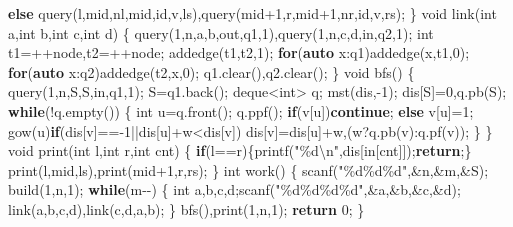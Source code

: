 \documentclass[
]{article}
\newenvironment{Shaded}{}{}
\newcommand{\ControlFlowTok}[1]{\textcolor[rgb]{0.00,0.44,0.13}{\textbf{#1}}}
\newcommand{\DataTypeTok}[1]{\textcolor[rgb]{0.56,0.13,0.00}{#1}}
\newcommand{\DecValTok}[1]{\textcolor[rgb]{0.25,0.63,0.44}{#1}}
\newcommand{\KeywordTok}[1]{\textcolor[rgb]{0.00,0.44,0.13}{\textbf{#1}}}
\newcommand{\NormalTok}[1]{#1}
\newcommand{\SpecialCharTok}[1]{\textcolor[rgb]{0.25,0.44,0.63}{#1}}
\newcommand{\StringTok}[1]{\textcolor[rgb]{0.25,0.44,0.63}{#1}}
\begin{document}
\begin{Shaded}
\begin{Highlighting}[]
    \ControlFlowTok{else}\NormalTok{ query(l,mid,nl,mid,id,v,ls),query(mid+}\DecValTok{1}\NormalTok{,r,mid+}\DecValTok{1}\NormalTok{,nr,id,v,rs);}
\NormalTok{\}}
\DataTypeTok{void}\NormalTok{ link(}\DataTypeTok{int}\NormalTok{ a,}\DataTypeTok{int}\NormalTok{ b,}\DataTypeTok{int}\NormalTok{ c,}\DataTypeTok{int}\NormalTok{ d)}
\NormalTok{\{}
\NormalTok{    query(}\DecValTok{1}\NormalTok{,n,a,b,out,q1,}\DecValTok{1}\NormalTok{),query(}\DecValTok{1}\NormalTok{,n,c,d,in,q2,}\DecValTok{1}\NormalTok{);}
    \DataTypeTok{int}\NormalTok{ t1=++node,t2=++node;}
\NormalTok{    addedge(t1,t2,}\DecValTok{1}\NormalTok{);}
    \ControlFlowTok{for}\NormalTok{(}\KeywordTok{auto}\NormalTok{ x:q1)addedge(x,t1,}\DecValTok{0}\NormalTok{);}
    \ControlFlowTok{for}\NormalTok{(}\KeywordTok{auto}\NormalTok{ x:q2)addedge(t2,x,}\DecValTok{0}\NormalTok{);}
\NormalTok{    q1.clear(),q2.clear();}
\NormalTok{\}}
\DataTypeTok{void}\NormalTok{ bfs()}
\NormalTok{\{}
\NormalTok{    query(}\DecValTok{1}\NormalTok{,n,S,S,in,q1,}\DecValTok{1}\NormalTok{); S=q1.back();}
\NormalTok{    deque\textless{}}\DataTypeTok{int}\NormalTok{\textgreater{} q; mst(dis,{-}}\DecValTok{1}\NormalTok{); dis[S]=}\DecValTok{0}\NormalTok{,q.pb(S);}
    \ControlFlowTok{while}\NormalTok{(!q.empty())}
\NormalTok{    \{}
        \DataTypeTok{int}\NormalTok{ u=q.front(); q.ppf();}
        \ControlFlowTok{if}\NormalTok{(v[u])}\ControlFlowTok{continue}\NormalTok{;}
        \ControlFlowTok{else}\NormalTok{ v[u]=}\DecValTok{1}\NormalTok{;}
\NormalTok{        gow(u)}\ControlFlowTok{if}\NormalTok{(dis[v]=={-}}\DecValTok{1}\NormalTok{||dis[u]+w\textless{}dis[v])}
\NormalTok{            dis[v]=dis[u]+w,(w?q.pb(v):q.pf(v));}
\NormalTok{    \}}
\NormalTok{\}}
\DataTypeTok{void}\NormalTok{ print(}\DataTypeTok{int}\NormalTok{ l,}\DataTypeTok{int}\NormalTok{ r,}\DataTypeTok{int}\NormalTok{ cnt)}
\NormalTok{\{}
    \ControlFlowTok{if}\NormalTok{(l==r)\{printf(}\StringTok{"}\SpecialCharTok{\%d\textbackslash{}n}\StringTok{"}\NormalTok{,dis[in[cnt]]);}\ControlFlowTok{return}\NormalTok{;\}}
\NormalTok{    print(l,mid,ls),print(mid+}\DecValTok{1}\NormalTok{,r,rs);}
\NormalTok{\}}
\DataTypeTok{int}\NormalTok{ work()}
\NormalTok{\{}
\NormalTok{    scanf(}\StringTok{"}\SpecialCharTok{\%d\%d\%d}\StringTok{"}\NormalTok{,\&n,\&m,\&S);}
\NormalTok{    build(}\DecValTok{1}\NormalTok{,n,}\DecValTok{1}\NormalTok{);}
    \ControlFlowTok{while}\NormalTok{(m{-}{-})}
\NormalTok{    \{}
        \DataTypeTok{int}\NormalTok{ a,b,c,d;scanf(}\StringTok{"}\SpecialCharTok{\%d\%d\%d\%d}\StringTok{"}\NormalTok{,\&a,\&b,\&c,\&d);}
\NormalTok{        link(a,b,c,d),link(c,d,a,b);}
\NormalTok{    \}}
\NormalTok{    bfs(),print(}\DecValTok{1}\NormalTok{,n,}\DecValTok{1}\NormalTok{);}
    \ControlFlowTok{return} \DecValTok{0}\NormalTok{;}
\NormalTok{\}}
\end{Highlighting}
\end{Shaded}
\end{document}
